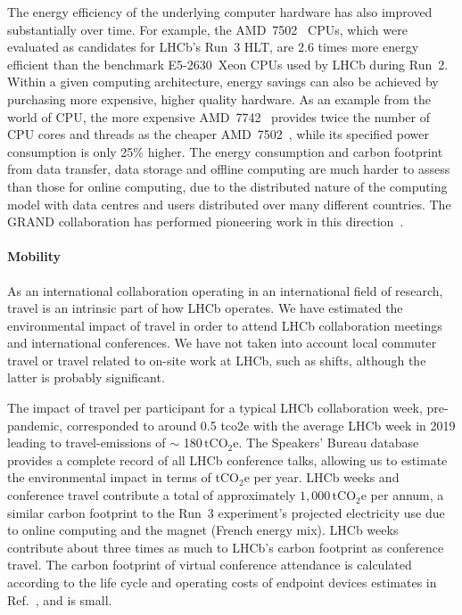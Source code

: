 \documentclass[../SustainableHEP.tex]{subfiles}
\begin{document}
\begin{casestudy}
The energy efficiency of the underlying computer hardware has also improved substantially over time. For example, the
AMD~7502~\cite{AMD7502} CPUs, which were evaluated as candidates for LHCb's Run~3 HLT, are $2.6$ times more energy efficient than 
the benchmark E5-2630~Xeon CPUs used by LHCb during Run~2. 
Within a given computing architecture, energy savings can also be achieved by purchasing more expensive, higher quality hardware. 
As an example from the world of CPU, the more expensive AMD~7742~\cite{AMD7742}
provides twice the number of CPU cores and threads as the cheaper AMD~7502~\cite{AMD7502},
while its specified power consumption is only 25\% higher. The energy consumption and carbon footprint from data transfer, data storage and offline computing are much harder to assess than those for online computing, due to the distributed nature of the computing model with data centres and users distributed over many different countries. The GRAND collaboration has performed pioneering work in this direction~\cite{GRAND}.

\paragraph{Mobility}
As an international collaboration operating in an international field of research, travel is an intrinsic part of how LHCb operates. We have estimated the environmental impact of travel in order to attend LHCb collaboration meetings and international conferences. We have not taken into account local commuter travel or travel related to on-site work at LHCb, such as shifts, although the latter is probably significant.

The impact of travel per participant for a typical LHCb collaboration week, pre-pandemic, corresponded to around 0.5 \acrshort{tco2e} with the average LHCb week in 2019 leading to travel-emissions of $\sim$ 180$\,\mathrm{tCO_2e}$. The Speakers' Bureau database provides a complete record of all LHCb conference talks, allowing us to estimate the environmental impact in terms of $\mathrm{tCO_2e}$ per year. LHCb weeks and conference travel contribute a total of approximately $1,000\,\mathrm{tCO_2e}$ per annum, a similar carbon footprint to the Run~3 experiment's projected electricity use due to online computing and the magnet (French energy mix). LHCb weeks contribute about three times as much to  LHCb's carbon footprint as conference travel.
 The carbon footprint of virtual conference attendance is calculated according to the life cycle and operating costs of endpoint devices estimates in Ref.~\cite{VideoConCO2}, and is small.


\end{casestudy}
\end{document}
